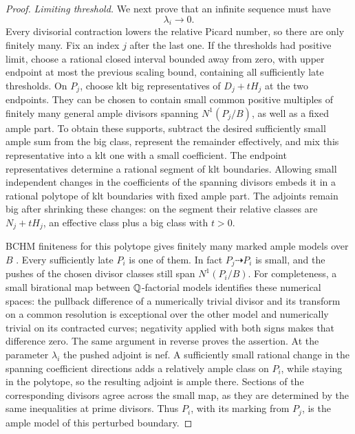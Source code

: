 \begin{proof}
\smallskip\noindent\emph{Limiting threshold.}
We next prove that an infinite sequence must have
\begin{equation}\label{inc:scaling-zero}
 \lambda_i\longrightarrow0.
\end{equation}
Every divisorial contraction lowers the relative Picard number, so
there are only finitely many.  Fix an index $j$ after the last one.
If the thresholds had positive limit, choose a rational closed
interval bounded away from zero, with upper endpoint at most the previous
scaling bound, containing all sufficiently late thresholds.  On $P_j$, choose
klt big representatives of $D_j+tH_j$ at the two endpoints.  They can
be chosen to contain small common positive multiples of finitely many
general ample divisors spanning $N^1(P_j/B)$, as well as a fixed ample
part.  To obtain these supports, subtract the desired sufficiently
small ample sum from the big class, represent the remainder effectively,
and mix this representative into a klt one with a small coefficient.
The endpoint representatives determine a rational segment of klt
boundaries.  Allowing small independent changes in the coefficients
of the spanning divisors embeds it in a rational polytope of klt
boundaries with fixed ample part.  The adjoints remain big after
shrinking these changes: on the segment their relative classes are
$N_j+tH_j$, an effective class plus a big class with $t>0$.

BCHM finiteness for this polytope gives finitely many marked ample
models over $B$ \cite[Corollary~1.1.5]{BCHM}.  Every sufficiently late $P_i$ is one of
them.  In fact $P_j\dashrightarrow P_i$ is small, and the pushes of the
chosen divisor classes still span $N^1(P_i/B)$.  For completeness, a
small birational map between $\mathbb Q$-factorial models identifies these
numerical spaces: the pullback difference of a numerically trivial
divisor and its transform on a common resolution is exceptional over
the other model and numerically trivial on its contracted curves;
negativity applied with both signs makes that difference zero.  The
same argument in reverse proves the assertion.  At the parameter
$\lambda_i$ the pushed adjoint is nef.  A sufficiently small rational
change in the spanning coefficient directions adds a relatively ample
class on $P_i$, while staying in the polytope, so the resulting adjoint
is ample there.  Sections of the corresponding divisors agree across
the small map, as they are determined by the same inequalities at
prime divisors.  Thus $P_i$, with its marking from $P_j$, is the ample
model of this perturbed boundary.


\end{proof}
